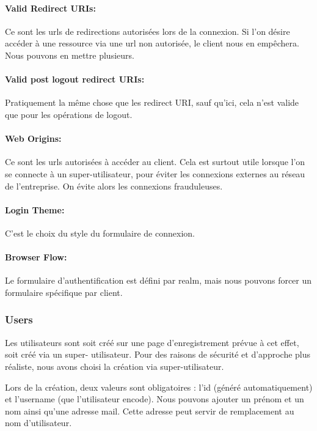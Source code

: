 \paragraph{Valid Redirect URIs:} Ce sont les urls de redirections autorisées lors de la connexion. Si l'on désire
accéder à une ressource via une url non autorisée, le client nous en empêchera. Nous pouvons en
mettre plusieurs.

\paragraph{Valid post logout redirect URIs:} Pratiquement la même chose que les redirect URI, sauf qu'ici, cela
n'est valide que pour les opérations de logout.

\paragraph{Web Origins:} Ce sont les urls autorisées à accéder au client. Cela est surtout utile lorsque l'on se
connecte à un super-utilisateur, pour éviter les connexions externes au réseau de l'entreprise. On
évite alors les connexions frauduleuses.

\paragraph{Login Theme:} C'est le choix du style du formulaire de connexion.

\paragraph{Browser Flow:} Le formulaire d'authentification est défini par realm, mais nous pouvons forcer un
formulaire spécifique par client.

\subsubsection{Users}

Les utilisateurs sont soit créé sur une page d'enregistrement prévue à cet effet, soit créé via un super-
utilisateur. Pour des raisons de sécurité et d'approche plus réaliste, nous avons choisi la création via
super-utilisateur.

Lors de la création, deux valeurs sont obligatoires : l'id (généré automatiquement) et l'username (que
l'utilisateur encode). Nous pouvons ajouter un prénom et un nom ainsi qu'une adresse mail. Cette
adresse peut servir de remplacement au nom d'utilisateur.

